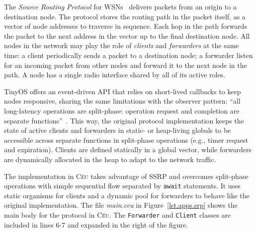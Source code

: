 \documentclass{sigplanconf}
\newcommand{\CEU}{\textsc{C\'{e}u}\xspace}
\newcommand{\code}[1] {{\small{\texttt{#1}}}}
\newcommand{\1}{\;}
\newcommand{\2}{\;\;}
\newcommand{\3}{\;\;\;}
\newcommand{\5}{\;\;\;\;\;}
\begin{document}
The \emph{Source Routing Protocol} for WSNs~\cite{wsn.teps} delivers packets 
from an origin to a destination node.
The protocol stores the routing path in the packet itself, as a vector of node 
addresses to traverse in sequence.
Each hop in the path forwards the packet to the next address in the vector up 
to the final destination node.
%
All nodes in the network may play the role of \emph{clients} and 
\emph{forwarders} at the same time:
%
a client periodically sends a packet to a destination node;
a forwarder listen for an incoming packet from other nodes and forward it to 
the next node in the path.
%
A node has a single radio interface shared by all of its active roles.

TinyOS offers an event-driven API that relies on short-lived callbacks to keep 
nodes responsive, sharing the same limitations with the observer pattern:
``all long-latency operations are split-phase: operation request and completion 
are separate functions''~\cite{wsn.nesc}.
%
This way, the original protocol implementation keeps the state of active 
clients and forwarders in static- or heap-living globals to be accessible 
across separate functions in split-phase operations (e.g., timer request and 
expiration).
%
Clients are defined statically in a global vector, while forwarders are 
dynamically allocated in the heap to adapt to the network traffic.

The implementation in \CEU takes advantage of SSRP and overcomes split-phase 
operations with simple sequential flow separated by \code{await} statements.
It uses static organisms for clients and a dynamic pool for forwarders to 
behave like the original implementation.
%
The file \emph{main.ceu} in Figure~\ref{lst.apps.srp} shows the main body for 
the protocol in \CEU.
The \code{Forwarder} and \code{Client} classes are included in lines 6-7 and 
expanded in the right of the figure.
\end{document}
